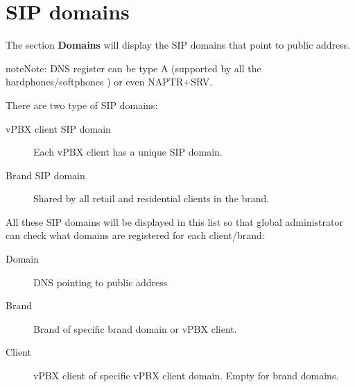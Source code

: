 \documentclass[letterpaper,10pt,english]{sphinxmanual}
\begin{document}
\section{SIP domains}
\label{administration_portal/platform/sip_domains:sip-domains}\label{administration_portal/platform/sip_domains::doc}\label{administration_portal/platform/sip_domains:god-sipdomains}
The section \textbf{Domains} will display the SIP domains that point to {\hyperref[administration_portal/platform/infrastructure/proxy_users:proxyusers]{}} public address.

\begin{notice}{note}{Note:}
DNS register can be type A (supported by all the hardphones/softphones
) or even NAPTR+SRV.
\end{notice}

There are two type of SIP domains:
\begin{description}
\item[{vPBX client SIP domain}] \leavevmode{}\label{administration_portal/platform/sip_domains:term-vpbx-client-sip-domain}
Each vPBX client has a unique SIP domain.

\item[{Brand SIP domain}] \leavevmode{}\label{administration_portal/platform/sip_domains:term-brand-sip-domain}
Shared by all retail and residential clients in the brand.

\end{description}

All these SIP domains will be displayed in this list so that global administrator can check
what domains are registered for each client/brand:
\begin{description}
\item[{Domain}] \leavevmode{}\label{administration_portal/platform/sip_domains:term-domain}
DNS pointing to {\hyperref[administration_portal/platform/infrastructure/proxy_users:proxyusers]{}} public address

\item[{Brand}] \leavevmode{}\label{administration_portal/platform/sip_domains:term-brand}
Brand of specific brand domain or vPBX client.

\item[{Client}] \leavevmode{}\label{administration_portal/platform/sip_domains:term-client}
vPBX client of specific vPBX client domain. Empty for brand domains.

\end{description}
\end{document}
